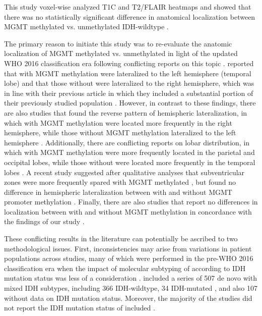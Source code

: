 This study voxel-wise analyzed \gls{T1C} and \gls{T2}/\gls{FLAIR} heatmaps and showed that there was no statistically significant difference in anatomical localization between \gls{MGMT} methylated vs. unmethylated \gls{IDH}-wildtype .

The primary reason to initiate this study was to re-evaluate the anatomic localization of \gls{MGMT} methylated vs. unmethylated  in light of the updated \gls{WHO} 2016 classification era following conflicting reports on this topic \autocite{smits2017imaging}.
 reported that  with \gls{MGMT} methylation were lateralized to the left hemisphere (temporal lobe) and that those without were lateralized to the right hemisphere, which was in line with their previous article in which they included a substantial portion of their previously studied  population \autocite{ellingson2012anatomic}.
However, in contrast to these findings, there are also studies that found the reverse pattern of hemispheric lateralization, in which  with \gls{MGMT} methylation were located more frequently in the right hemisphere, while those without \gls{MGMT} methylation lateralized to the left hemisphere \autocite{wang2014anatomical}.
Additionally, there are conflicting reports on lobar distribution, in which  with \gls{MGMT} methylation were more frequently located in the parietal and occipital lobes, while those without were located more frequently in the temporal lobes \autocite{eoli2007methylation}.
A recent study suggested after qualitative analyses that subventricular zones were more frequently spared with \gls{MGMT} methylated , but found no difference in hemispheric lateralization between  with and without \gls{MGMT} promoter methylation \autocite{han2018structural}.
Finally, there are also studies that report no differences in localization between  with and without \gls{MGMT} methylation in concordance with the findings of our study \autocite{carillo2012relationship, drabycz2010analysis}.

These conflicting results in the literature can potentially be ascribed to two methodological issues.
First, inconsistencies may arise from variations in  patient populations across studies, many of which were performed in the pre-\gls{WHO} 2016 classification era when the impact of molecular subtyping of  according to \gls{IDH} mutation status was less of a consideration \autocite{louis20162016}.
 included a series of 507 de novo  with mixed \gls{IDH} subtypes, including 366 \gls{IDH}-wildtype, 34 \gls{IDH}-mutated , and also 107  without data on \gls{IDH} mutation status.
Moreover, the majority of the studies did not report the \gls{IDH} mutation status of included  \autocite{ellingson2012anatomic,wang2014anatomical,eoli2007methylation,drabycz2010analysis}.

